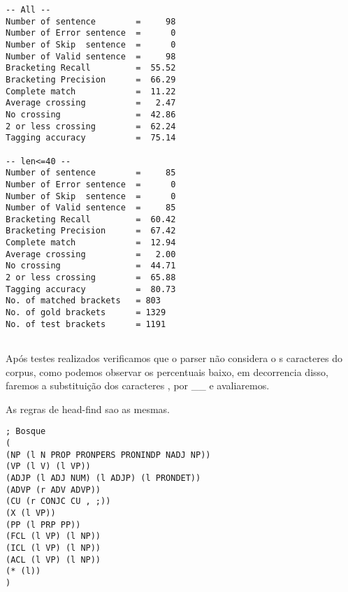 \begin{verbatim}
-- All --
Number of sentence        =     98
Number of Error sentence  =      0
Number of Skip  sentence  =      0
Number of Valid sentence  =     98
Bracketing Recall         =  55.52
Bracketing Precision      =  66.29
Complete match            =  11.22
Average crossing          =   2.47
No crossing               =  42.86
2 or less crossing        =  62.24
Tagging accuracy          =  75.14

-- len<=40 --
Number of sentence        =     85
Number of Error sentence  =      0
Number of Skip  sentence  =      0
Number of Valid sentence  =     85
Bracketing Recall         =  60.42
Bracketing Precision      =  67.42
Complete match            =  12.94
Average crossing          =   2.00
No crossing               =  44.71
2 or less crossing        =  65.88
Tagging accuracy          =  80.73
No. of matched brackets   = 803
No. of gold brackets      = 1329
No. of test brackets      = 1191


\end{verbatim}

\normalsize

Após testes realizados verificamos que o parser não considera o s caracteres \-\- do corpus, como podemos observar os percentuais baixo, em decorrencia disso, faremos a substituição dos caracteres \-\-, por \_\_ e avaliaremos.

As regras de head-find sao as mesmas.

\scriptsize
\begin{verbatim}
; Bosque
(
(NP (l N PROP PRONPERS PRONINDP NADJ NP))
(VP (l V) (l VP))
(ADJP (l ADJ NUM) (l ADJP) (l PRONDET))
(ADVP (r ADV ADVP))
(CU (r CONJC CU , ;))
(X (l VP))
(PP (l PRP PP))
(FCL (l VP) (l NP))
(ICL (l VP) (l NP))
(ACL (l VP) (l NP))
(* (l))
)

\end{verbatim}

